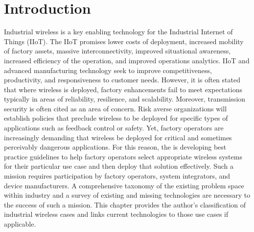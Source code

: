 	\section{Introduction} \label{sec:intro}
    Industrial wireless is a key enabling technology for the Industrial Internet of Things (IIoT).  The IIoT promises lower costs of deployment, increased mobility of factory assets, massive interconnectivity, improved situational awareness, increased efficiency of the operation, and improved operations analytics.  IIoT and advanced manufacturing technology seek to improve competitiveness, productivity, and responsiveness to customer needs. However, it is often stated that where wireless is deployed, factory enhancements fail to meet expectations typically in areas of reliability, resilience, and scalability. Moreover, transmission security is often cited as an area of concern. Risk averse organizations will establish policies that preclude wireless to be deployed for specific types of applications such as feedback control or safety. Yet, factory operators are increasingly demanding that wireless be deployed for critical and sometimes perceivably dangerous applications.  For this reason, the
\iftoggle{blindcopy}{(BLIND COPY - NAME REMOVED)}{National Institute of Standards and Technology (NIST)} 
is developing best practice guidelines to help factory operators select appropriate wireless systems for their particular use case and then deploy that solution effectively.  Such a mission requires participation by factory operators, system integrators, and device manufacturers. A comprehensive taxonomy of the existing problem space within industry and a survey of existing and missing technologies are necessary to the success of such a mission. This chapter provides the author's classification of industrial wireless cases and links current technologies to those use cases if applicable. 
    
